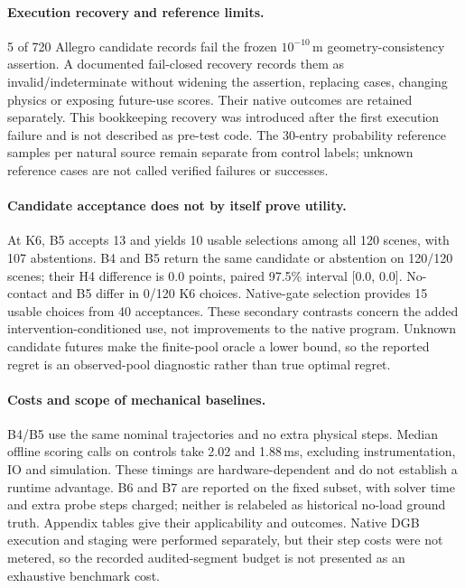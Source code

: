 \paragraph{Execution recovery and reference limits.}
5 of 720 Allegro candidate records fail the frozen
$10^{-10}$\,m geometry-consistency assertion. A documented fail-closed recovery
records them as invalid/indeterminate without widening the assertion, replacing
cases, changing physics or exposing future-use scores. Their native outcomes
are retained separately. This bookkeeping recovery was introduced after the
first execution failure and is not described as pre-test code. The 30-entry
probability reference samples per natural source remain separate from control
labels; unknown reference cases are not called verified failures or successes.

\paragraph{Candidate acceptance does not by itself prove utility.}
At K6, B5 accepts 13 and yields 10 usable
selections among all 120 scenes, with 107 abstentions.
B4 and B5 return the same candidate or abstention on 120/120 scenes;
their H4 difference is 0.0 points, paired 97.5\% interval
[0.0, 0.0].
No-contact and B5 differ in 0/120 K6 choices. Native-gate
selection provides 15 usable choices from
40 acceptances. These secondary contrasts concern the added
intervention-conditioned use, not improvements to the native program.
Unknown candidate futures make the finite-pool oracle a lower bound, so the
reported regret is an observed-pool diagnostic rather than true optimal regret.

\paragraph{Costs and scope of mechanical baselines.}
B4/B5 use the same nominal trajectories and no extra physical steps. Median
offline scoring calls on controls take 2.02 and 1.88\,ms,
excluding instrumentation, IO and simulation. These timings are
hardware-dependent and do not establish a runtime advantage. B6 and B7 are
reported on the fixed subset, with solver time and extra probe steps charged;
neither is relabeled as historical no-load ground truth. Appendix tables give
their applicability and outcomes. Native DGB execution and staging were
performed separately, but their step costs were not metered, so the recorded
audited-segment budget is not presented as an exhaustive benchmark cost.

